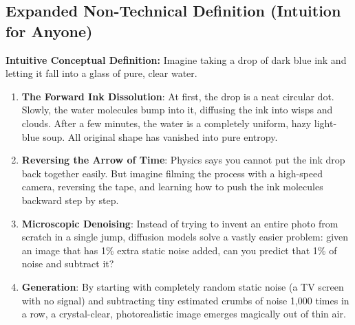 \documentclass[11pt,a4paper]{article}
\theoremstyle{definition}
\begin{document}
\subsection{Expanded Non-Technical Definition (Intuition for Anyone)}
\textbf{Intuitive Conceptual Definition:}
Imagine taking a drop of dark blue ink and letting it fall into a glass of pure, clear water. 
\begin{enumerate}
    \item \textbf{The Forward Ink Dissolution}: At first, the drop is a neat circular dot. Slowly, the water molecules bump into it, diffusing the ink into wisps and clouds. After a few minutes, the water is a completely uniform, hazy light-blue soup. All original shape has vanished into pure entropy.
    \item \textbf{Reversing the Arrow of Time}: Physics says you cannot put the ink drop back together easily. But imagine filming the process with a high-speed camera, reversing the tape, and learning how to push the ink molecules backward step by step.
    \item \textbf{Microscopic Denoising}: Instead of trying to invent an entire photo from scratch in a single jump, diffusion models solve a vastly easier problem: given an image that has 1\% extra static noise added, can you predict that 1\% of noise and subtract it?
    \item \textbf{Generation}: By starting with completely random static noise (a TV screen with no signal) and subtracting tiny estimated crumbs of noise 1,000 times in a row, a crystal-clear, photorealistic image emerges magically out of thin air.
\end{enumerate}
\end{document}
